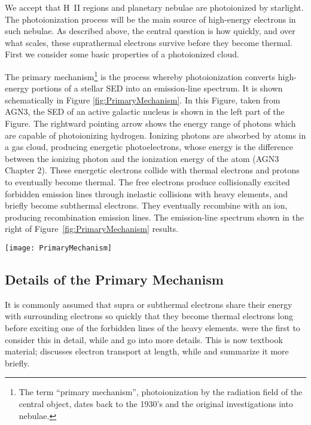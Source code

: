 \documentclass[debug, preprint, twocolumn]{rmaa}
\begin{document}
We accept that H~II regions and planetary nebulae are photoionized by starlight. 
The photoionization process will be the main source of high-energy electrons in such nebulae.
As described above, the central question is how quickly, and over what scales, these suprathermal electrons survive
before they become thermal.
First we consider some basic properties of a photoionized cloud.

The primary mechanism\footnote{
The term ``primary mechanism'', photoionization by the radiation field of the central object, 
dates back to the 1930's and the original investigations into nebulae.} 
is the process whereby photoionization converts high-energy portions of a stellar SED
into an emission-line spectrum.
It is shown schematically in Figure \ref{fig:PrimaryMechanism}.
In this Figure, taken from AGN3, the  SED
of an active galactic nucleus is shown in the left part of the Figure. 
The rightward pointing arrow shows the energy range of photons which are capable of 
photoionizing hydrogen. 
Ionizing photons are absorbed by atoms 
in a gas cloud, producing  energetic photoelectrons, whose energy is the difference between the ionizing photon and the ionization energy of the atom (AGN3 Chapter 2). 
These energetic electrons collide with thermal electrons and protons to eventually
become thermal.
The free electrons  produce collisionally excited forbidden emission lines through inelastic collisions
with heavy elements,
and briefly become subthermal electrons.
They eventually recombine with an ion, producing recombination emission lines. 
The emission-line spectrum shown in the right of  Figure~\ref{fig:PrimaryMechanism} results. 

\begin{figure*}[t]
\texttt{[image: PrimaryMechanism]}
\caption[The primary mechanism]{The ``primary mechanism'', converting an SED into emission lines.
\label{fig:PrimaryMechanism}}
\end{figure*}


\subsection{Details of the Primary Mechanism}

It is commonly assumed that supra or subthermal electrons share their 
energy with surrounding electrons so quickly that they become thermal electrons long 
before exciting one of the forbidden lines of the heavy elements.
\citet{1947ApJ...105..131B} were the first to consider this in detail,
while  \citet{1953PhRv...89..977S} and \citet{1954PhRv...94..511B} go into more details.
This is now textbook material; \citet{Spitzer1962} discusses electron transport at length, while \citet{1978ppim.book.....S} and \citet{2005ppfa.book.....K} summarize it more briefly.
\end{document}
